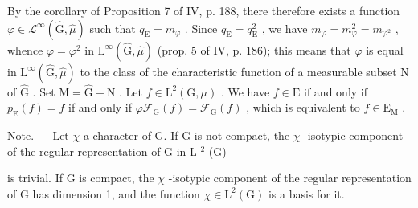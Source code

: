By the corollary of Proposition 7 of IV, p. 188, there therefore exists a function \(\varphi \in \mathcal{L}^{\infty}(\widehat{\mathrm{G}},\widehat{\mu})\) such that \(q_{\mathrm{E}} = m_{\varphi}\) . Since \(q_{\mathrm{E}} = q_{\mathrm{E}}^{2}\) , we have \(m_{\varphi} = m_{\varphi}^{2} = m_{\varphi^{2}}\) , whence \(\varphi = \varphi^{2}\) in \(\mathrm{L}^{\infty}(\widehat{\mathrm{G}},\widehat{\mu})\) (prop. 5 of IV, p. 186); this means that \(\varphi\) is equal in \(\mathrm{L}^{\infty}(\widehat{\mathrm{G}},\widehat{\mu})\) to the class of the characteristic function of a measurable subset N of \(\widehat{\mathrm{G}}\) . Set \(\mathrm{M} = \widehat{\mathrm{G}} - \mathrm{N}\) . Let \(f \in \mathrm{L}^{2}(\mathrm{G},\mu)\) . We have \(f \in \mathrm{E}\) if and only if \(p_{\mathrm{E}}(f) = f\) if and only if \(\varphi \mathcal{F}_{\mathrm{G}}(f) = \mathcal{F}_{\mathrm{G}}(f)\) , which is equivalent to \(f \in \mathrm{E}_{\mathrm{M}}\) .

Note. --- Let \(\chi\) a character of G. If G is not compact, the \(\chi\) -isotypic component of the regular representation of G in L \(^{2}\) (G)

is trivial. If G is compact, the \(\chi\) -isotypic component of the regular representation of G has dimension 1, and the function \(\chi \in \mathrm{L}^{2}(\mathrm{G})\) is a basis for it.

